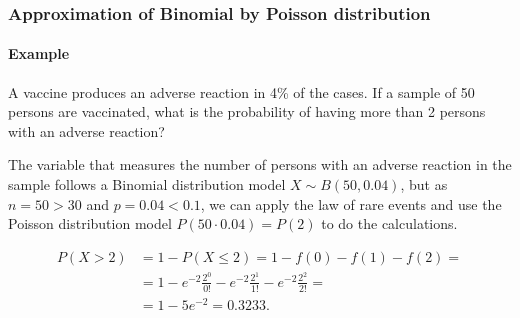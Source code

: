 \begin{frame}
\frametitle{Approximation of Binomial by Poisson distribution}
\framesubtitle{Example}
A vaccine produces an adverse reaction in 4\% of the cases.
If a sample of 50 persons are vaccinated, what is the probability of having more than 2 persons with an adverse reaction?

The variable that measures the number of persons with an adverse reaction in the sample follows a Binomial distribution model $X\sim B(50,0.04)$, but as $n=50>30$ and $p=0.04<0.1$, we can apply the law of rare events and use the Poisson distribution model $P(50\cdot 0.04)=P(2)$ to do the calculations. 

\begin{align*}
P(X>2) &= 1-P(X\leq 2) = 1-f(0)-f(1)-f(2) =\\
&= 1-e^{-2}\frac{2^0}{0!}-e^{-2}\frac{2^1}{1!}-e^{-2}\frac{2^2}{2!} =\\
&= 1-5e^{-2} = 0.3233.
\end{align*}
\end{frame}

